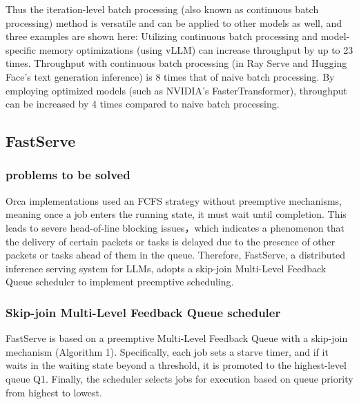 \documentclass[conference]{IEEEtran}
\begin{document}
Thus the iteration-level batch processing (also known as continuous batch processing) method is versatile and can be applied to other models as well, and three examples are shown here:
Utilizing continuous batch processing and model-specific memory optimizations (using vLLM) can increase throughput by up to 23 times.  \cite{b11}
Throughput with continuous batch processing (in Ray Serve and Hugging Face's text generation inference) is 8 times that of naive batch processing. \cite{b12}
By employing optimized models (such as NVIDIA's FasterTransformer), throughput can be increased by 4 times compared to naive batch processing. \cite{b12}

\subsection{FastServe}
\subsubsection{problems to be solved}

Orca implementations used an FCFS strategy without preemptive mechanisms, meaning once a job enters the running state, it must wait until completion. This leads to severe head-of-line blocking issues，which indicates a phenomenon that the delivery of certain packets or tasks is delayed due to the presence of other packets or tasks ahead of them in the queue. Therefore, FastServe, a distributed inference serving system for LLMs, adopts a skip-join Multi-Level Feedback Queue scheduler to implement preemptive scheduling.
\subsubsection{Skip-join Multi-Level Feedback Queue scheduler}


FastServe is based on a preemptive Multi-Level Feedback Queue with a skip-join mechanism (Algorithm 1). Specifically, each job sets a starve timer, and if it waits in the waiting state beyond a threshold, it is promoted to the highest-level queue Q1. Finally, the scheduler selects jobs for execution based on queue priority from highest to lowest.
\end{document}

